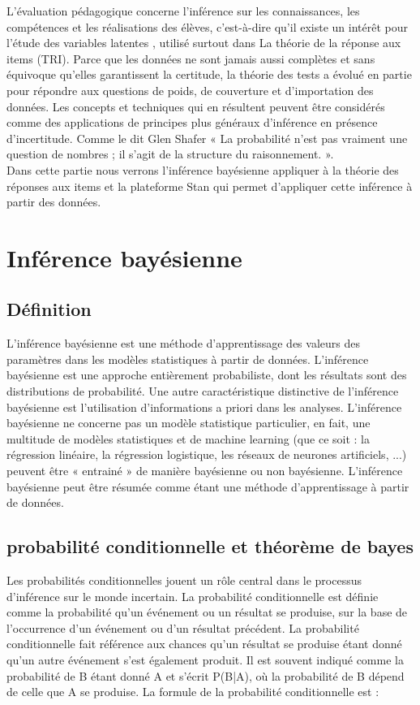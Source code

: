 L'évaluation pédagogique concerne l'inférence sur les connaissances, les compétences et les réalisations des élèves, c’est-à-dire qu’il existe un intérêt pour l'étude des variables latentes \cite{azevedo2011bayesian}, utilisé surtout dans La théorie de la réponse aux items (TRI). Parce que les données ne sont jamais aussi complètes et sans équivoque qu'elles garantissent la certitude, la théorie des tests a évolué en partie pour répondre aux questions de poids, de couverture et d'importation des données. Les concepts et techniques qui en résultent peuvent être considérés comme des applications de principes plus généraux d'inférence en présence d’incertitude. Comme le dit Glen Shafer « La probabilité n'est pas vraiment une question de nombres ; il s'agit de la structure du raisonnement. ». \\
Dans cette partie nous verrons l’inférence bayésienne appliquer à la théorie des réponses aux items et la plateforme Stan qui permet d’appliquer cette inférence à partir des données.\\

\section{Inférence bayésienne}
\subsection{Définition}
L'inférence bayésienne est une méthode d'apprentissage des valeurs des paramètres dans les modèles statistiques à partir de données. L'inférence bayésienne est une approche entièrement probabiliste, dont les résultats sont des distributions de probabilité. Une autre caractéristique distinctive de l'inférence bayésienne est l'utilisation d'informations a priori dans les analyses. L'inférence bayésienne ne concerne pas un modèle statistique particulier, en fait, une multitude de modèles statistiques et de machine learning (que ce soit : la régression linéaire, la régression logistique, les réseaux de neurones artificiels, ...) peuvent être « entrainé » de manière bayésienne ou non bayésienne. L'inférence bayésienne peut être résumée comme étant une méthode d'apprentissage à partir de données.

\subsection{probabilité conditionnelle et théorème de bayes}
Les probabilités conditionnelles jouent un rôle central dans le processus d'inférence sur le monde incertain. La probabilité conditionnelle est définie comme la probabilité qu'un événement ou un résultat se produise, sur la base de l'occurrence d'un événement ou d'un résultat précédent. La probabilité conditionnelle fait référence aux chances qu'un résultat se produise étant donné qu'un autre événement s'est également produit. Il est souvent indiqué comme la probabilité de B étant donné A et s'écrit P(B|A), où la probabilité de B dépend de celle que A se produise. La formule de la probabilité conditionnelle est :

